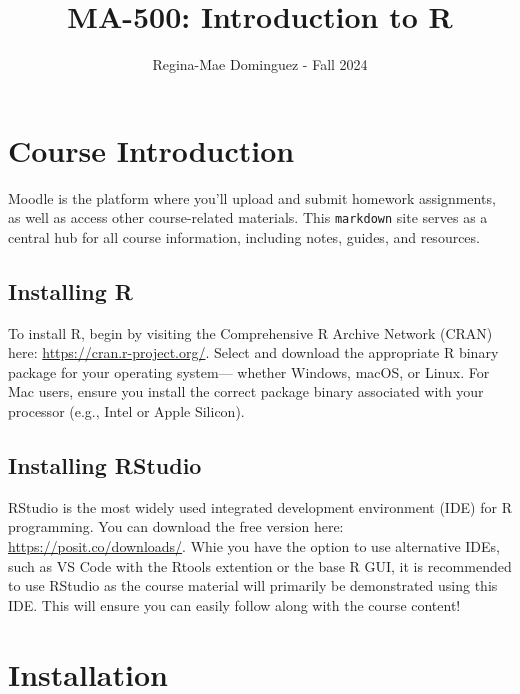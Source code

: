 \documentclass[
]{book}
\title{MA-500: Introduction to R}
\author{Regina-Mae Dominguez - Fall 2024}
\date{}
\begin{document}
\maketitle

{
\setcounter{tocdepth}{1}
\tableofcontents
}
\hypertarget{course-introduction}{%
\chapter*{Course Introduction}\label{course-introduction}}

Moodle is the platform where you'll upload and submit homework assignments, as well as access other course-related materials. This \texttt{markdown} site serves as a central hub for all course information, including notes, guides, and resources.

\hypertarget{installing-r}{%
\section*{Installing R}\label{installing-r}}

To install R, begin by visiting the Comprehensive R Archive Network (CRAN) here: \url{https://cran.r-project.org/}. Select and download the appropriate R binary package for your operating system--- whether Windows, macOS, or Linux. For Mac users, ensure you install the correct package binary associated with your processor (e.g., Intel or Apple Silicon).

\hypertarget{installing-rstudio}{%
\section*{Installing RStudio}\label{installing-rstudio}}

RStudio is the most widely used integrated development environment (IDE) for R programming. You can download the free version here: \url{https://posit.co/downloads/}. Whie you have the option to use alternative IDEs, such as VS Code with the Rtools extention or the base R GUI, it is recommended to use RStudio as the course material will primarily be demonstrated using this IDE. This will ensure you can easily follow along with the course content!

\hypertarget{installation}{%
\chapter*{Installation}\label{installation}}
\end{document}
